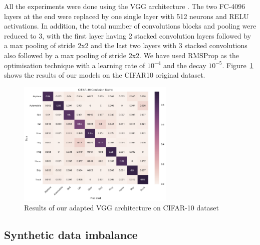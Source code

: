 \documentclass[runningheads,a4paper]{llncs}
\begin{document}
All the experiments were done using the VGG architecture \cite{simonyan2014very}. The two FC-4096 layers at the end were replaced by one single layer with 512 neurons and RELU activations. In addition, the total number of convolutions blocks and pooling were reduced to 3, with the first layer having 2 stacked convolution layers followed by a max pooling of stride 2x2 and the last two layers with 3 stacked convolutions also followed by a max pooling of stride 2x2. We have used RMSProp  \cite{bengiormsprop} as the optimisation technique with a learning rate of $10^{-4}$ and the decay $10^{-5}$. Figure~\ref{fig:conf_matrix_full} shows the results of our models on the CIFAR10 original dataset.

\begin{figure}
	\centering
	\includegraphics[height=6.0cm]{conf_matrix.png}
	\caption{Results of our adapted VGG architecture on CIFAR-10 dataset}
	\label{fig:conf_matrix_full}
\end{figure}

\subsection{Synthetic data imbalance}
\end{document}

